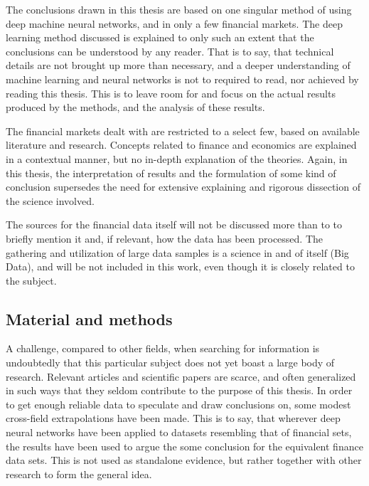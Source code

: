 The conclusions drawn in this thesis are based on one singular method of using deep machine neural networks, and in only a few financial markets. The deep learning method discussed is explained to only such an extent that the conclusions can be understood by any reader. That is to say, that technical details are not brought up more than necessary, and a deeper understanding of machine learning and neural networks is not to required to read, nor achieved by reading this thesis. This is to leave room for and focus on the actual results produced by the methods, and the analysis of these results.

The financial markets dealt with are restricted to a select few, based on available literature and research. Concepts related to finance and economics are explained in a contextual manner, but no in-depth explanation of the theories. Again, in this thesis, the interpretation of results and the formulation of some kind of conclusion supersedes the need for extensive explaining and rigorous dissection of the science involved.

The sources for the financial data itself will not be discussed more than to to briefly mention it and, if relevant, how the data has been processed. The gathering and utilization of large data samples is a science in and of itself (Big Data), and will be not included in this work, even though it is closely related to the subject.


\subsection{Material and methods}


A challenge, compared to other fields, when searching for information is undoubtedly that this particular subject does not yet boast a large body of research. Relevant articles and scientific papers are scarce, and often generalized in such ways that they seldom contribute to the purpose of this thesis. In order to get enough reliable data to speculate and draw conclusions on, some modest cross-field extrapolations have been made. This is to say, that wherever deep neural networks have been applied to datasets resembling that of financial sets, the results have been used to argue the some conclusion for the equivalent finance data sets. This is not used as standalone evidence, but rather together with other research to form the general idea.

